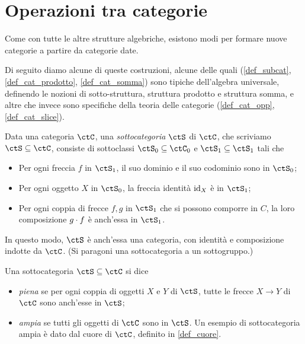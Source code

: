 \section{Operazioni tra categorie}\label{sec_operazioni}
Come con tutte le altre strutture algebriche, esistono modi per formare nuove categorie a partire da categorie date.

Di seguito diamo alcune di queste costruzioni, alcune delle quali (\ref{def_subcat}, \ref{def_cat_prodotto}, \ref{def_cat_somma}) sono tipiche dell'algebra universale, definendo le nozioni di sotto-struttura, struttura prodotto e struttura somma, e altre che invece sono specifiche della teoria delle categorie (\ref{def_cat_opp}, \ref{def_cat_slice}).

\begin{definition}\label{def_subcat}
 Data una categoria \(\ctC\), una \emph{sottocategoria} \(\ctS\) di \(\ctC\), che scriviamo \(\ctS\subseteq \ctC\), consiste di sottoclassi \(\ctS_0\subseteq\ctC_0\) e \(\ctS_1\subseteq\ctS_1\) tali che
 \begin{itemize}
  \item Per ogni freccia \(f\) in \(\ctS_1\), il suo dominio e il suo codominio sono in \(\ctS_0\);
  \item Per ogni oggetto \(X\) in \(\ctS_0\), la freccia identità \(\mathrm{id}_X\) è in \(\ctS_1\);
  \item Per ogni coppia di frecce \(f,g\) in \(\ctS_1\) che si possono comporre in \(C\), la loro composizione \(g\cdot f\) è anch'essa in \(\ctS_1\).
 \end{itemize}
 In questo modo, \(\ctS\) è anch'essa una categoria, con identità e composizione indotte da \(\ctC\). (Si paragoni una sottocategoria a un sottogruppo.)

 Una sottocategoria \(\ctS\subseteq \ctC\) si dice
 \begin{itemize}
  \item \emph{piena} se per ogni coppia di oggetti \(X\) e \(Y\) di \(\ctS\), tutte le frecce \(X\to Y\) di \(\ctC\) sono anch'esse in \(\ctS\);
  \item \emph{ampia} se tutti gli oggetti di \(\ctC\) sono in \(\ctS\). Un esempio di sottocategoria	ampia è dato dal cuore di \(\ctC\), definito in \ref{def_cuore}.
 \end{itemize}
\end{definition}
